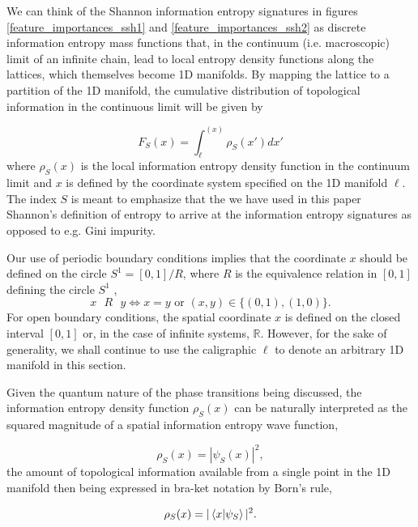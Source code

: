 \documentclass[10pt]{revtex4-1}
\begin{document}
We can think of the Shannon information entropy signatures in figures \ref{feature_importances_ssh1} and \ref{feature_importances_ssh2} as discrete information entropy mass functions that, in the continuum (i.e. macroscopic) limit of an infinite chain, lead to local entropy density functions along the lattices, which themselves become 1D manifolds. By mapping the lattice to a  partition of the 1D manifold, the cumulative distribution of topological information in the continuous limit will be given by

\begin{equation}
\label{entropy_density}
F_S(x) = \int_{\ell}^{(x)}\rho_S(x')dx'
\end{equation}
where $\rho_S(x)$ is the local information entropy density function in the continuum limit and $x$ is defined by the coordinate system specified on the 1D manifold $\ell$. The index $S$ is meant to emphasize that the we have used in this paper Shannon's definition of entropy to arrive at the information entropy signatures as opposed to e.g. Gini impurity. 

Our use of periodic boundary conditions implies that the coordinate $x$ should be defined on the circle $ S^1 = [0, 1]/R$, where $R$ is the equivalence relation in $[0,1]$ defining the circle $S^1$ , 
\begin{equation}
x \text{ } R \text{ } y \iff x=y \text{ or } (x,y)\in \{(0,1), (1,0)\}.
\end{equation}
For open boundary conditions, the spatial coordinate $x$ is defined on the closed interval $[0,1]$ or, in the case of infinite systems, $\mathbb{R}$. However, for the sake of generality, we shall continue to use the caligraphic $\ell$ to denote an arbitrary 1D manifold in this section. 

Given the quantum nature of the phase transitions being discussed, the information entropy density function $\rho_S(x)$ can be naturally interpreted as the squared magnitude of a spatial information entropy wave function,

\begin{equation}
\label{shannon_wave_function}
\rho_S(x) = |\psi_S(x)|^2,
\end{equation}
the amount of topological information available from a single point in the 1D manifold then being expressed in bra-ket notation by Born's rule,  

\begin{equation}
\label{born_rule_spatial}
\rho_S(x) = |\braket{x|\psi_S}|^2.
\end{equation}
\end{document}
